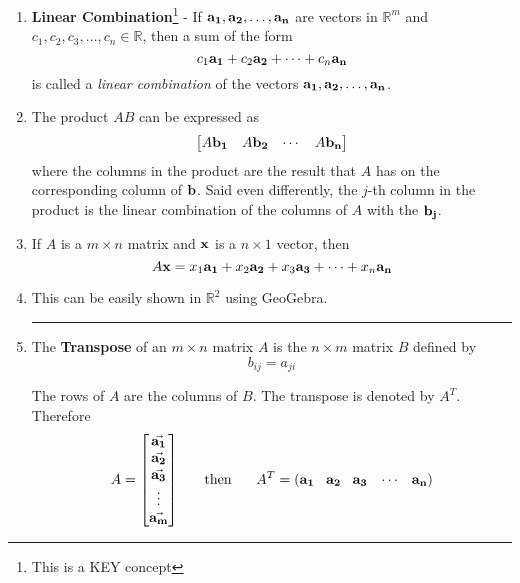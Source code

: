 \begin{enumerate}
\item \textbf{Linear Combination}\footnote{This is a KEY concept} - If ${\bf a_1}, {\bf a_2}, \dots, {\bf a_n}$ are vectors in $\mathbb{R}^m$ and $c_1, c_2, c_3, \dots, c_n \in \mathbb{R}$, then a sum of the form
\[  c_1 {\bf a_1} + c_2 {\bf a_2} + \cdots + c_n {\bf a_n} \]
is called a \textit{linear combination} of the vectors ${\bf a_1}, {\bf a_2}, \dots, {\bf a_n}$.








\item The product $AB$ can be expressed as 
\[  \begin{bmatrix} A {\bf b_1} & A {\bf b_2} & \cdots & A {\bf b_n} \end{bmatrix} \]
where the columns in the product are the result that $A$ has on the corresponding column of ${\bf b}$.   Said even differently, the $j$-th column in the product is the linear combination of the columns of $A$ with the ${\bf b_j}$. 


\item If $A$ is a $m \times n$ matrix and ${\bf x}$ is a $n \times 1$ vector, then 
\[ A {\bf x} = x_1 {\bf a_1} + x_2 {\bf a_2} + x_3 {\bf a_3} + \cdots + x_n {\bf a_n} \]







\item This can be easily shown in $\mathbb{R}^2$ using GeoGebra.









\rule[0.01in]{\textwidth}{0.0025in}














\item The \textbf{Transpose} of an $m \times n$ matrix $A$ is the $n \times m$ matrix $B$ defined by
\[ b_{ij} = a_{ji} \]

The rows of $A$ are the columns of $B$.  The transpose is denoted by $A^T$.
Therefore
 $$A = \begin{bmatrix} \vec{{\bf a_1}}\\ \vec{{\bf a_2}} \\ \vec{{\bf a_3}} \\ \vdots \\ \vec{{\bf a_m}} \end{bmatrix}     \hspace{0.5cm} \text{ then } \hspace{0.5cm}      A^T=({\bf a_1} \;\; \;{\bf a_2} \; \;\; {\bf a_3} \; \;\; \cdots \; \;\; {\bf a_n})$$


\end{enumerate}
